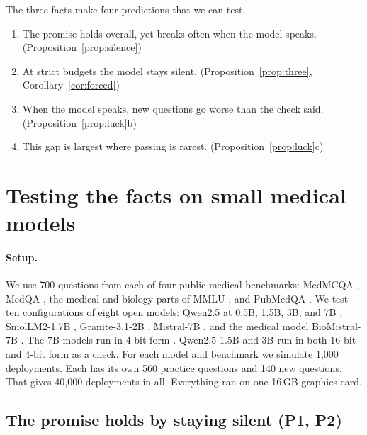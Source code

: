 \documentclass[11pt]{article}
\theoremstyle{plain}
\theoremstyle{definition}
\begin{document}
The three facts make four predictions that we can test.
\begin{enumerate}[label=\textbf{P\arabic*.},leftmargin=2.2em]
    \item The promise holds overall, yet breaks often when the model speaks. \hfill (Proposition~\ref{prop:silence})
    \item At strict budgets the model stays silent. \hfill (Proposition~\ref{prop:three}, Corollary~\ref{cor:forced})
    \item When the model speaks, new questions go worse than the check said. \hfill (Proposition~\ref{prop:luck}b)
    \item This gap is largest where passing is rarest. \hfill (Proposition~\ref{prop:luck}c)
\end{enumerate}

\section{Testing the facts on small medical models}
\label{sec:experiments}

\paragraph{Setup.} We use 700 questions from each of four public medical benchmarks: MedMCQA \citep{pal2022medmcqa}, MedQA \citep{jin2021disease}, the medical and biology parts of MMLU \citep{hendrycks2021mmlu}, and PubMedQA \citep{jin2019pubmedqa}. We test ten configurations of eight open models: Qwen2.5 at 0.5B, 1.5B, 3B, and 7B \citep{qwen2024qwen25}, SmolLM2-1.7B \citep{allal2025smollm2}, Granite-3.1-2B \citep{granite2024}, Mistral-7B \citep{jiang2023mistral}, and the medical model BioMistral-7B \citep{labrak2024biomistral}. The 7B models run in 4-bit form \citep{dettmers2023qlora}. Qwen2.5 1.5B and 3B run in both 16-bit and 4-bit form as a check. For each model and benchmark we simulate 1{,}000 deployments. Each has its own 560 practice questions and 140 new questions. That gives 40{,}000 deployments in all. Everything ran on one 16\,GB graphics card.

\subsection{The promise holds by staying silent (P1, P2)}
\end{document}
